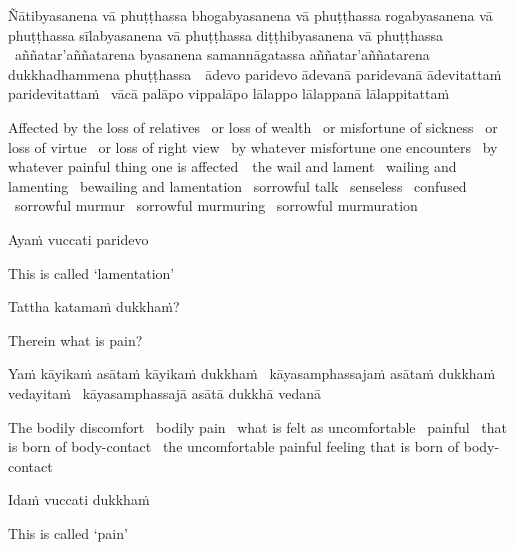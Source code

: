 \begin{pali-hang}
  Ñātibyasanena vā phuṭṭhassa bhogabyasanena vā phuṭṭhassa rogabyasanena vā phuṭṭhassa sīlabyasanena vā phuṭṭhassa diṭṭhibyasanena vā phuṭṭhassa \breathmark\ aññatar'aññatarena byasanena samannāgatassa aññatar'aññatarena dukkhadhammena \mbox{phuṭṭhassa}~\breathmark\ ādevo paridevo ādevanā paridevanā ādevitattaṁ paridevitattaṁ \breathmark\ vācā palāpo vippalāpo lālappo lālappanā lālappitattaṁ
\end{pali-hang}

\begin{english-hang-verses}
  Affected by the loss of relatives \breathmark\ or loss of wealth \breathmark\ or misfortune of sickness \breathmark\ or loss of virtue \breathmark\ or loss of right view \breathmark\ by whatever misfortune one encounters \breathmark\ by whatever painful thing one is \mbox{affected}~\breathmark\ the wail and lament \breathmark\ wailing and lamenting \breathmark\ bewailing and lamentation \breathmark\ sorrowful talk \breathmark\ senseless \breathmark\ confused \breathmark\ sorrowful murmur \breathmark\ sorrowful murmuring \breathmark\ sorrowful murmuration
\end{english-hang-verses}

Ayaṁ vuccati paridevo

\begin{english}
  This is called `lamentation'
\end{english}

Tattha katamaṁ dukkhaṁ?

\begin{english}
  Therein what is pain?
\end{english}

\begin{pali-hang}
  Yaṁ kāyikaṁ asātaṁ kāyikaṁ dukkhaṁ \breathmark\ kāyasamphassajaṁ asātaṁ dukkhaṁ vedayitaṁ \breathmark\ kāyasamphassajā asātā dukkhā vedanā
\end{pali-hang}

\begin{english-hang-verses}
  The bodily discomfort \breathmark\ bodily pain \breathmark\ what is felt as uncomfortable \breathmark\ painful \breathmark\ that is born of body-contact \breathmark\ the uncomfortable painful feeling that is born of body-contact
\end{english-hang-verses}

Idaṁ vuccati dukkhaṁ

\begin{english}
  This is called `pain'
\end{english}


